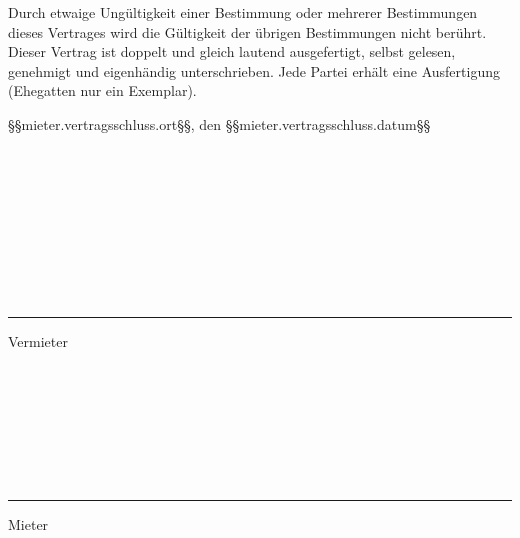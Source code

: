 \documentclass{scrreprt}[12pt,a4paper,twoside,duplex]
\begin{document}
\begin{contract}
	Durch etwaige Ungültigkeit einer Bestimmung oder mehrerer Bestimmungen dieses Vertrages wird die Gültigkeit der übrigen Bestimmungen nicht berührt.
	Dieser Vertrag ist doppelt und gleich lautend ausgefertigt, selbst gelesen, genehmigt und eigenhändig unterschrieben. Jede Partei erhält eine Ausfertigung (Ehegatten nur ein Exemplar).
\end{contract}

\newpage

§§mieter.vertragsschluss.ort§§, den §§mieter.vertragsschluss.datum§§

    \

    \

    \

    \

    \



    \hrule\vspace{1ex} Vermieter

    \

    \

    \

    \

    \hrule\vspace{1ex} Mieter


    
\end{document}

